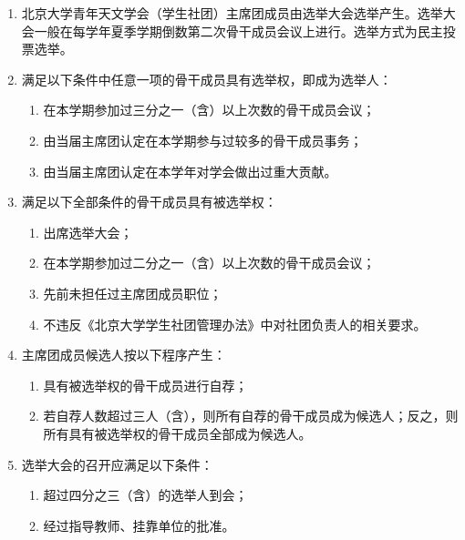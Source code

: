 \begin{enumerate}[resume]
    \item 北京大学青年天文学会（学生社团）主席团成员由选举大会选举产生。选举大会一般在每学年夏季学期倒数第二次骨干成员会议上进行。选举方式为民主投票选举。
    
    \item 满足以下条件中任意一项的骨干成员具有选举权，即成为选举人：
    
    \begin{enumerate}
        \item 在本学期参加过三分之一（含）以上次数的骨干成员会议；
        \item 由当届主席团认定在本学期参与过较多的骨干成员事务；
        \item 由当届主席团认定在本学年对学会做出过重大贡献。
    \end{enumerate}
    
    \item 满足以下全部条件的骨干成员具有被选举权：
    
    \begin{enumerate}
        \item 出席选举大会；
        \item 在本学期参加过二分之一（含）以上次数的骨干成员会议；
        \item 先前未担任过主席团成员职位；
        \item 不违反《北京大学学生社团管理办法》中对社团负责人的相关要求。
    \end{enumerate}
    
    \item 主席团成员候选人按以下程序产生：
    
    \begin{enumerate}
        \item 具有被选举权的骨干成员进行自荐；
        \item 若自荐人数超过三人（含），则所有自荐的骨干成员成为候选人；反之，则所有具有被选举权的骨干成员全部成为候选人。
    \end{enumerate}
    
    \item 选举大会的召开应满足以下条件：
    
    \begin{enumerate}
        \item 超过四分之三（含）的选举人到会；
        \item 经过指导教师、挂靠单位的批准。
    \end{enumerate}
    

\end{enumerate}
